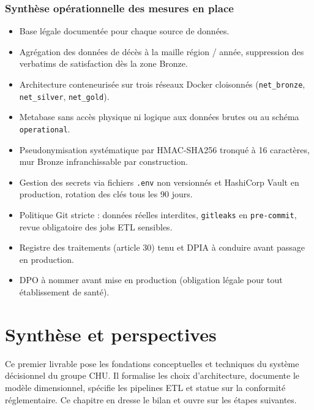 \documentclass[12pt, a4paper]{report}
\begin{document}
\begin{itemize}[label=\textcolor{chuBlue}{\textbullet}]
\subsection{Synthèse opérationnelle des mesures en place}

\begin{infobox}
\begin{itemize}[leftmargin=0.8cm, label=\textcolor{chuBlue}{\textbullet}]
  \item Base légale documentée pour chaque source de données.
  \item Agrégation des données de décès à la maille région / année, suppression des verbatims de satisfaction dès la zone Bronze.
  \item Architecture conteneurisée sur trois réseaux Docker cloisonnés (\texttt{net\_bronze}, \texttt{net\_silver}, \texttt{net\_gold}).
  \item Metabase sans accès physique ni logique aux données brutes ou au schéma \texttt{operational}.
  \item Pseudonymisation systématique par HMAC-SHA256 tronqué à 16 caractères, mur Bronze infranchissable par construction.
  \item Gestion des secrets via fichiers \texttt{.env} non versionnés et HashiCorp Vault en production, rotation des clés tous les 90 jours.
  \item Politique Git stricte : données réelles interdites, \texttt{gitleaks} en \texttt{pre-commit}, revue obligatoire des jobs ETL sensibles.
  \item Registre des traitements (article 30) tenu et DPIA à conduire avant passage en production.
  \item DPO à nommer avant mise en production (obligation légale pour tout établissement de santé).
\end{itemize}
\end{infobox}


\chapter{Synthèse et perspectives}

Ce premier livrable pose les fondations conceptuelles et techniques du système décisionnel du groupe CHU. Il formalise les choix d'architecture, documente le modèle dimensionnel, spécifie les pipelines ETL et statue sur la conformité réglementaire. Ce chapitre en dresse le bilan et ouvre sur les étapes suivantes.


\end{itemize}
\end{document}
